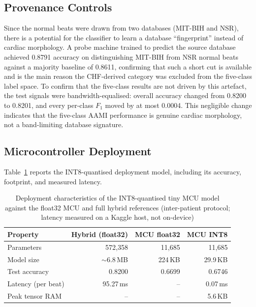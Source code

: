 \subsection{Provenance Controls}
\label{subsec:provenance}

Since the normal beats were drawn from two databases (MIT-BIH and NSR),
there is a potential for the classifier to learn a database ``fingerprint''
instead of cardiac morphology. A probe machine trained to predict the
source database achieved 0.8791 accuracy on distinguishing MIT-BIH from
NSR normal beats against a majority baseline of 0.8611, confirming that
such a short cut is available and is the main reason the CHF-derived
category was excluded from the five-class label space. To confirm that the five-class
results are not driven by this artefact, the test signals were
bandwidth-equalised: overall accuracy changed from 0.8200 to 0.8201, and
every per-class $F_1$ moved by at most 0.0004. This negligible change
indicates that the five-class AAMI performance is genuine cardiac
morphology, not a band-limiting database signature.

\subsection{Microcontroller Deployment}
\label{subsec:mcu}

Table~\ref{tab:mcu} reports the INT8-quantised deployment model, including
its accuracy, footprint, and measured latency.

\begin{table}[!t]
\centering
\caption[Deployment characteristics of the INT8-quantised tiny MCU model]{Deployment characteristics of the INT8-quantised tiny MCU model against the float32 MCU and full hybrid references (inter-patient protocol; latency measured on a Kaggle host, not on-device)}
\label{tab:mcu}
\begin{tabular}{lrrr}
\toprule
\textbf{Property} & \textbf{Hybrid (float32)} & \textbf{MCU float32} & \textbf{MCU INT8} \\
\midrule
Parameters       & 572{,}358 & 11{,}685 & 11{,}685 \\
Model size       & $\sim$6.8\,MB & 224\,KB & 29.9\,KB \\
Test accuracy    & 0.8200 & 0.6699 & 0.6746 \\
Latency (per beat) & 95.27\,ms & -- & 0.07\,ms \\
Peak tensor RAM  & -- & -- & 5.6\,KB \\
\bottomrule
\end{tabular}
\end{table}

